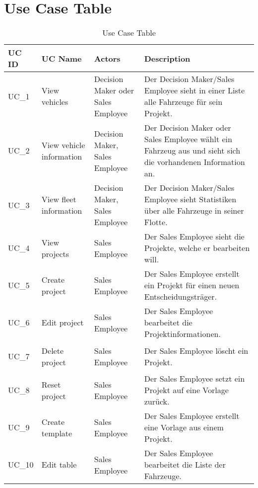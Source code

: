 \section{Use Case Table}
\sffamily
\begin{footnotesize}
  \renewcommand{\arraystretch}{1.4}
  \begin{longtable}[i i i L]{ p{} p{} p{} p{} }
    \caption                       %
        {Use Case Table} %
        \\
    \toprule
    \textbf{UC ID} & \textbf{UC Name} & \textbf{Actors}  & \textbf{Description}\\
    \midrule
    \hypertarget{Ref:UC1}{UC\_1} & View vehicles & Decision Maker oder Sales Employee & Der Decision Maker/Sales Employee sieht in einer Liste alle Fahrzeuge für sein Projekt. \\
    \hypertarget{Ref:UC2}{UC\_2} & View vehicle information & Decision Maker, Sales Employee & Der Decision Maker oder Sales Employee wählt ein Fahrzeug aus und sieht sich die vorhandenen Information an. \\
    \hypertarget{Ref:UC3}{UC\_3}  & View fleet information & Decision Maker, Sales Employee & Der Decision Maker/Sales Employee sieht Statistiken über alle Fahrzeuge in seiner Flotte. \\
    \hypertarget{Ref:UC4}{UC\_4}  & View projects & Sales Employee & Der Sales Employee sieht die Projekte, welche er bearbeiten will. \\
    \hypertarget{Ref:UC5}{UC\_5} & Create project & Sales Employee & Der Sales Employee erstellt ein Projekt für einen neuen Entscheidungsträger. \\
    \hypertarget{Ref:UC6}{UC\_6} & Edit project & Sales Employee & Der Sales Employee bearbeitet die Projektinformationen. \\
    \hypertarget{Ref:UC7}{UC\_7} & Delete project & Sales Employee & Der Sales Employee löscht ein Projekt. \\
    \hypertarget{Ref:UC8}{UC\_8} & Reset project & Sales Employee & Der Sales Employee setzt ein Projekt auf eine Vorlage zurück. \\
    \hypertarget{Ref:UC9}{UC\_9} & Create template & Sales Employee & Der Sales Employee erstellt eine Vorlage aus einem Projekt. \\
    \hypertarget{Ref:UC10}{UC\_10} & Edit table & Sales Employee & Der Sales Employee bearbeitet die Liste der Fahrzeuge. \\

\end{longtable}
\end{footnotesize}
